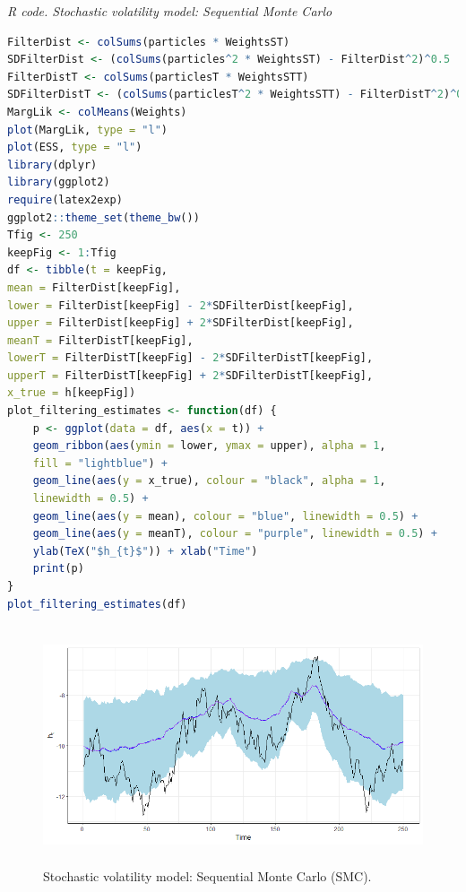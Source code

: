 \begin{enumerate}[leftmargin=*]
\begin{tcolorbox}[enhanced,width=4.67in,center upper,
	fontupper=\large\bfseries,drop shadow southwest,sharp corners]
	\textit{R code. Stochastic volatility model: Sequential Monte Carlo}
	\begin{VF}
		\begin{lstlisting}[language=R]
FilterDist <- colSums(particles * WeightsST)
SDFilterDist <- (colSums(particles^2 * WeightsST) - FilterDist^2)^0.5
FilterDistT <- colSums(particlesT * WeightsSTT)
SDFilterDistT <- (colSums(particlesT^2 * WeightsSTT) - FilterDistT^2)^0.5
MargLik <- colMeans(Weights)
plot(MargLik, type = "l")
plot(ESS, type = "l")
library(dplyr)
library(ggplot2)
require(latex2exp)
ggplot2::theme_set(theme_bw())
Tfig <- 250
keepFig <- 1:Tfig
df <- tibble(t = keepFig,
mean = FilterDist[keepFig],
lower = FilterDist[keepFig] - 2*SDFilterDist[keepFig],
upper = FilterDist[keepFig] + 2*SDFilterDist[keepFig],
meanT = FilterDistT[keepFig],
lowerT = FilterDistT[keepFig] - 2*SDFilterDistT[keepFig],
upperT = FilterDistT[keepFig] + 2*SDFilterDistT[keepFig],
x_true = h[keepFig])
plot_filtering_estimates <- function(df) {
	p <- ggplot(data = df, aes(x = t)) +
	geom_ribbon(aes(ymin = lower, ymax = upper), alpha = 1,
	fill = "lightblue") +
	geom_line(aes(y = x_true), colour = "black", alpha = 1,
	linewidth = 0.5) +
	geom_line(aes(y = mean), colour = "blue", linewidth = 0.5) +
	geom_line(aes(y = meanT), colour = "purple", linewidth = 0.5) +
	ylab(TeX("$h_{t}$")) + xlab("Time")
	print(p)
}
plot_filtering_estimates(df)
\end{lstlisting}
	\end{VF}
\end{tcolorbox} 

\begin{figure}[!h]
	\includegraphics[width=340pt, height=200pt]{Chapters/chapter8/figures/SMCsv_resam}
	\caption[List of figure caption goes here]{Stochastic volatility model: Sequential Monte Carlo (SMC).}\label{fig5}
\end{figure}


\end{enumerate}
